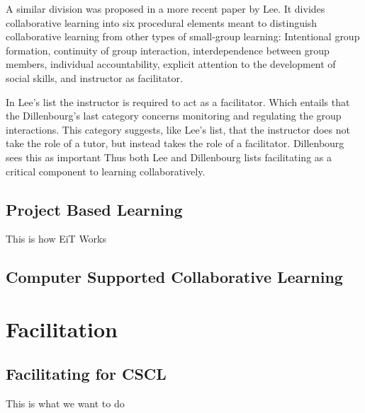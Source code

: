         A similar division was proposed in a more recent paper by Lee. It divides collaborative learning into six procedural elements meant to distinguish collaborative learning from other types of small-group learning: Intentional group formation, continuity of group interaction, interdependence between group members, individual accountability, explicit attention to the development of social skills, and instructor as facilitator. \cite{Lee2009}
        
        In Lee's list the instructor is required to act as a facilitator. Which entails that the  \cite{Lee2009} Dillenbourg's last category concerns monitoring and regulating the group interactions. This category suggests, like Lee's list, that the instructor does not take the role of a tutor, but instead takes the role of a facilitator. Dillenbourg sees this as important  \cite{dillenbourg1999} Thus both Lee and Dillenbourg lists facilitating as a critical component to learning collaboratively.
        
        \subsection{Project Based Learning}
        This is how EiT Works
        
        \subsection{Computer Supported Collaborative Learning}
    
    \section{Facilitation}
        \subsection{Facilitating for CSCL}
        This is what we want to do